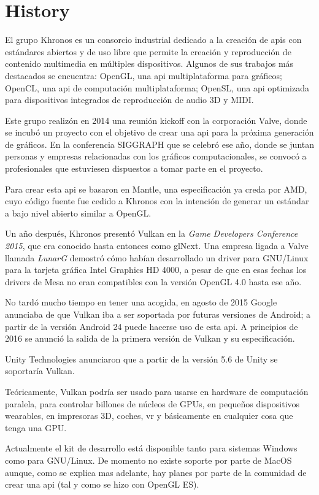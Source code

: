 \chapter{History}
El grupo Khronos es un consorcio industrial dedicado a la creación de \gls{api}s con estándares abiertos y de uso libre
que permite la creación y reproducción de contenido multimedia en múltiples dispositivos. Algunos de sus trabajos más
destacados se encuentra: OpenGL, una \gls{api} multiplataforma para gráficos; OpenCL, una \gls{api} de computación
multiplataforma; OpenSL, una \gls{api} optimizada para dispositivos integrados de reproducción de audio 3D y MIDI.

Este grupo realizón en 2014 una reunión kickoff con la corporación Valve, donde se incubó un proyecto con el objetivo
de crear una \gls{api} para la próxima generación de gráficos. En la conferencia SIGGRAPH que se celebró ese año, donde
se juntan personas y empresas relacionadas con los gráficos computacionales, se convocó a profesionales que estuviesen
dispuestos a tomar parte en el proyecto.

Para crear esta \gls{api} se basaron en Mantle, una especificación ya creda por AMD, cuyo código fuente fue cedido a
Khronos con la intención de generar un estándar a bajo nivel abierto similar a OpenGL.

Un año después, Khronos presentó Vulkan en la \emph{Game Developers Conference 2015}, que era conocido hasta entonces
como glNext. Una empresa ligada a Valve llamada \emph{LunarG} demostró cómo habían desarrollado un driver para GNU/Linux
para la tarjeta gráfica Intel Graphics HD 4000, a pesar de que en esas fechas los drivers de Mesa no eran compatibles
con la versión OpenGL 4.0 hasta ese año.

No tardó mucho tiempo en tener una acogida, en agosto de 2015 Google anunciaba de que Vulkan iba a ser soportada por
futuras versiones de Android; a partir de la versión Android 24 puede hacerse uso de esta \gls{api}. A principios de
2016 se anunció la salida de la primera versión de Vulkan y su especificación.

Unity Technologies anunciaron que a partir de la versión 5.6 de Unity se soportaría Vulkan.

Teóricamente, Vulkan podría ser usado para usarse en hardware de computación paralela, para controlar billones de
núcleos de GPUs, en pequeños dispositivos wearables, en impresoras 3D, coches, \gls{vr} y básicamente en cualquier
cosa que tenga una GPU.

Actualmente el kit de desarrollo está disponible tanto para sistemas Windows como para GNU/Linux. De momento no existe
soporte por parte de MacOS aunque, como se explica mas adelante, hay planes por parte de la comunidad de crear una
\gls{api} (tal y como se hizo con OpenGL ES).
